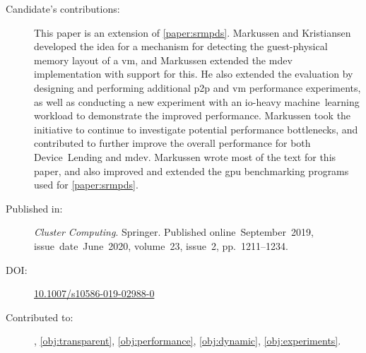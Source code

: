 \begin{description}
	\item[Candidate's contributions:]
		This paper is an extension of \cref{paper:srmpds}.
		Markussen and Kristiansen developed the idea for a mechanism for detecting the guest-physical memory layout of a \gls{vm}, and Markussen
		extended the \gls{mdev} implementation with support for this.
		He also extended the evaluation by designing and performing additional \gls{p2p} and \gls{vm} performance experiments,
		as well as conducting a new experiment with an \gls{io}-heavy machine~learning workload to demonstrate the improved performance.
		Markussen took the initiative to continue to investigate potential performance bottlenecks, and contributed to further improve the overall performance for both Device~Lending and \gls{mdev}.
		Markussen wrote most of the text for this paper, and also improved and extended the \gls{gpu} benchmarking programs used
		for \cref{paper:srmpds}.


	\item[Published in:]
		\emph{Cluster Computing}. Springer.
		Published online~September~2019,
		issue~date~June~2020,
		volume~23, issue~2, pp.~1211--1234.

	\item[DOI:] \href{https://doi.org/10.1007/s10586-019-02988-0}{10.1007/s10586-019-02988-0}

	\item[Contributed to:]
		, \cref{obj:transparent}, \cref{obj:performance}, \cref{obj:dynamic}, \cref{obj:experiments}.

\end{description}

